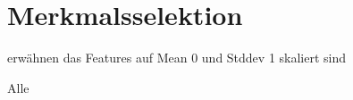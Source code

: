 \section{Merkmalsselektion}
\label{merkmalsselektion}

erwähnen das Features auf Mean 0 und Stddev 1 skaliert sind

Alle
